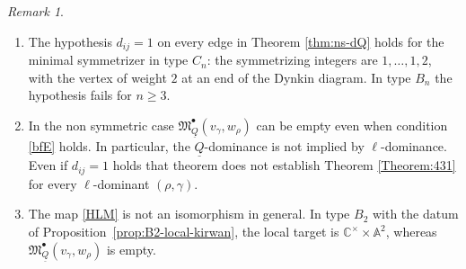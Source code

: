 \documentclass[11pt,reqno]{amsart}
\theoremstyle{definition}
\theoremstyle{remark}
\newtheorem{Remark}[Theorem]{Remark}
\def\bbC{\mathbb C}
\def\bbZ{\mathbb Z}
\def\dQ{\underline Q}
\def\M{\mathfrak M}
\begin{document}
\begin{Remark}\hfill
\begin{enumerate}[label=$\mathrm{(\alph*)}$,leftmargin=8mm]
\item The hypothesis $d_{ij}=1$ on every edge in
Theorem \ref{thm:ns-dQ} holds for the minimal symmetrizer in type
$C_n$: the symmetrizing integers are $1,\ldots,1,2$, with the
vertex of weight $2$ at an end of the Dynkin diagram. In type
$B_n$ the hypothesis fails for $n\geqslant3$.


\item In the non symmetric case $\M^\bullet_{\dQ}(v_\gamma,w_\rho)$  can be empty even when condition \eqref{bfE} holds. 
In particular, the $\dQ$-dominance is not implied by $\ell$-dominance. 
Even if  $d_{ij}=1$ holds that theorem does not establish Theorem \ref{Theorem:431} 
for every $\ell$-dominant $(\rho,\gamma)$. 

%
\item
The map \eqref{HLM} is not an isomorphism in general.
In type $B_2$ with the datum of Proposition~\ref{prop:B2-local-kirwan}, the local
target is $\bbC^\times\times\mathbb A^2$, whereas
$\M^\bullet_{\dQ}(v_\gamma,w_\rho)$ is empty. 


\end{enumerate}
\end{Remark}
\end{document}
